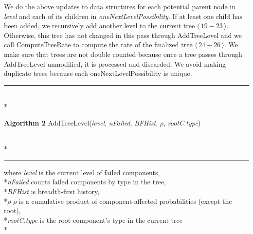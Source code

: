 \documentclass[12pt]{article}
\newcommand{\captionAmerica}[2]{\noindent\hrLine\vspace{-0.25em}\\*{\raggedright\textbf{Algorithm #1} #2}\vspace{-0.8em}\\*\hrLine}
\newcommand{\hrLine}{\hspace{\fill}\rule{1.0\linewidth}{.7pt}\hspace{\fill}}
\newcommand{\varName}[1]{\textrm{\it#1}}
\newcommand{\citeBlock}[2]{$\langle \, #1 - #2 \, \rangle$}
\begin{document}
We do the above updates to data structures for each potential parent node in \varName{level} and each of its children in \varName{oneNextLevelPossibility}. If at least one child has been added, we recursively add another level to the current tree \citeBlock{19}{23}. Otherwise, this tree has not changed in this pass through AddTreeLevel and we call ComputeTreeRate to compute the rate of the finalized tree \citeBlock{24}{26}. We make sure that trees are not double counted because once a tree passes through AddTreeLevel unmodified, it is processed and discarded. We avoid making duplicate trees because each oneNextLevelPossibility is unique.

\captionAmerica{2}{AddTreeLevel(\varName{level}, \varName{nFailed}, \varName{BFHist}, $\rho$, \varName{rootC.type})}
where \varName{level} is the current level of failed components, \\*\varName{nFailed} counts failed components by type in the tree, \\*\varName{BFHist} is breadth-first history, \\*$\rho$ $\rho$ is a cumulative product of component-affected probabilities (except the root), \\*\varName{rootC.type} is the root component's type in the current tree
\\*\vspace{0.8em}
\end{document}
